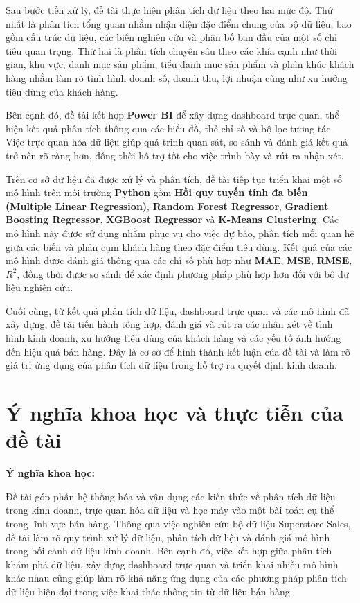 Sau bước tiền xử lý, đề tài thực hiện phân tích dữ liệu theo hai mức độ. Thứ nhất là phân tích tổng quan nhằm nhận diện đặc điểm chung của bộ dữ liệu, bao gồm cấu trúc dữ liệu, các biến nghiên cứu và phân bố ban đầu của một số chỉ tiêu quan trọng. Thứ hai là phân tích chuyên sâu theo các khía cạnh như thời gian, khu vực, danh mục sản phẩm, tiểu danh mục sản phẩm và phân khúc khách hàng nhằm làm rõ tình hình doanh số, doanh thu, lợi nhuận cũng như xu hướng tiêu dùng của khách hàng.

Bên cạnh đó, đề tài kết hợp \textbf{Power BI} để xây dựng dashboard trực quan, thể hiện kết quả phân tích thông qua các biểu đồ, thẻ chỉ số và bộ lọc tương tác. Việc trực quan hóa dữ liệu giúp quá trình quan sát, so sánh và đánh giá kết quả trở nên rõ ràng hơn, đồng thời hỗ trợ tốt cho việc trình bày và rút ra nhận xét.

Trên cơ sở dữ liệu đã được xử lý và phân tích, đề tài tiếp tục triển khai một số mô hình trên môi trường \textbf{Python} gồm \textbf{Hồi quy tuyến tính đa biến (Multiple Linear Regression)}, \textbf{Random Forest Regressor}, \textbf{Gradient Boosting Regressor}, \textbf{XGBoost Regressor} và \textbf{K-Means Clustering}. Các mô hình này được sử dụng nhằm phục vụ cho việc dự báo, phân tích mối quan hệ giữa các biến và phân cụm khách hàng theo đặc điểm tiêu dùng. Kết quả của các mô hình được đánh giá thông qua các chỉ số phù hợp như \textbf{MAE}, \textbf{MSE}, \textbf{RMSE}, \textbf{\(R^2\)}, đồng thời được so sánh để xác định phương pháp phù hợp hơn đối với bộ dữ liệu nghiên cứu.

Cuối cùng, từ kết quả phân tích dữ liệu, dashboard trực quan và các mô hình đã xây dựng, đề tài tiến hành tổng hợp, đánh giá và rút ra các nhận xét về tình hình kinh doanh, xu hướng tiêu dùng của khách hàng và các yếu tố ảnh hưởng đến hiệu quả bán hàng. Đây là cơ sở để hình thành kết luận của đề tài và làm rõ giá trị ứng dụng của phân tích dữ liệu trong hỗ trợ ra quyết định kinh doanh.



\section{Ý nghĩa khoa học và thực tiễn của đề tài}

\textbf{Ý nghĩa khoa học:}

Đề tài góp phần hệ thống hóa và vận dụng các kiến thức về phân tích dữ liệu trong kinh doanh, trực quan hóa dữ liệu và học máy vào một bài toán cụ thể trong lĩnh vực bán hàng. Thông qua việc nghiên cứu bộ dữ liệu Superstore Sales, đề tài làm rõ quy trình xử lý dữ liệu, phân tích dữ liệu và đánh giá mô hình trong bối cảnh dữ liệu kinh doanh. Bên cạnh đó, việc kết hợp giữa phân tích khám phá dữ liệu, xây dựng dashboard trực quan và triển khai nhiều mô hình khác nhau cũng giúp làm rõ khả năng ứng dụng của các phương pháp phân tích dữ liệu hiện đại trong việc khai thác thông tin từ dữ liệu bán hàng.


